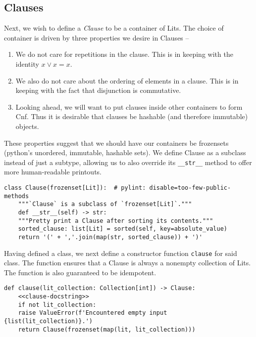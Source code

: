 \documentclass[11pt]{article}
\begin{document}
\subsection{Clauses}
\label{sec:org3708534}
Next, we wish to define a \emph{Clause} to be a container of Lits. The choice of
container is driven by three properties we desire in Clauses --
\begin{enumerate}
\item We do not care for repetitions in the clause. This is in keeping with the
identity \(x\vee x=x\).
\item We also do not care about the ordering of elements in a clause. This is in
keeping with the fact that disjunction is commutative.
\item Looking ahead, we will want to put clauses inside other containers to form
Cnf. Thus it is desirable that clauses be hashable (and therefore immutable)
objects.
\end{enumerate}
These properties suggest that we should have our containers be frozensets
(python's unordered, immutable, hashable sets).  We define Clause as a subclass
instead of just a subtype, allowing us to also override its \texttt{\_\_str\_\_} method to
offer more human-readable printouts.

\begin{verbatim}
class Clause(frozenset[Lit]):  # pylint: disable=too-few-public-methods
    """`Clause` is a subclass of `frozenset[Lit]`."""
    def __str__(self) -> str:
	"""Pretty print a Clause after sorting its contents."""
	sorted_clause: list[Lit] = sorted(self, key=absolute_value)
	return '(' + ','.join(map(str, sorted_clause)) + ')'
\end{verbatim}

Having defined a class, we next define a constructor function \texttt{clause} for said
class. The function ensures that a Clause is always a nonempty collection of
Lits. The function is also guaranteed to be idempotent.
\begin{verbatim}
def clause(lit_collection: Collection[int]) -> Clause:
    <<clause-docstring>>
    if not lit_collection:
	raise ValueError(f'Encountered empty input {list(lit_collection)}.')
    return Clause(frozenset(map(lit, lit_collection)))
\end{verbatim}
\end{document}
